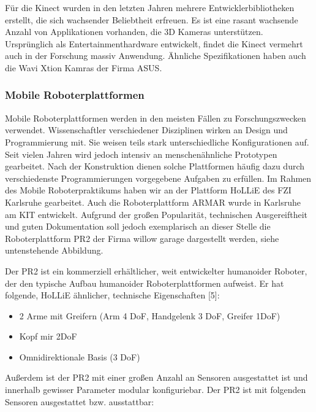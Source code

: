 
Für die Kinect wurden in den letzten Jahren mehrere Entwicklerbibliotheken erstellt, die sich wachsender Beliebtheit erfreuen.  Es ist eine rasant wachsende Anzahl von Applikationen vorhanden, die 3D Kameras unterstützen. Ursprünglich als Entertainmenthardware entwickelt, findet die Kinect vermehrt auch in der Forschung massiv Anwendung. Ähnliche Spezifikationen haben auch die Wavi Xtion Kamras der Firma ASUS.

\subsubsection{Mobile Roboterplattformen}

Mobile Roboterplattformen werden in den meisten Fällen zu Forschungszwecken verwendet. Wissenschaftler verschiedener Disziplinen wirken an Design und Programmierung mit. Sie weisen teils stark unterschiedliche Konfigurationen auf. Seit vielen Jahren wird jedoch intensiv an menschenähnliche Prototypen gearbeitet. Nach der Konstruktion dienen solche Plattformen häufig dazu durch verschiedenste Programmierungen vorgegebene Aufgaben zu erfüllen. Im Rahmen des Mobile Roboterpraktikums haben wir an der Plattform HoLLiE des FZI Karlsruhe gearbeitet. Auch die Roboterplattform ARMAR wurde in Karlsruhe am KIT entwickelt.
Aufgrund der großen Popularität, technischen Ausgereiftheit und guten Dokumentation soll jedoch exemplarisch an dieser Stelle die Roboterplattform PR2 der Firma willow garage dargestellt werden, siehe untenstehende Abbildung.


Der PR2 ist ein kommerziell erhältlicher, weit entwickelter humanoider Roboter, der den typische Aufbau humanoider Roboterplattformen aufweist. Er hat folgende, HoLLiE ähnlicher, technische Eigenschaften [5]:

\begin{itemize}
  \item 2 Arme mit Greifern (Arm 4 DoF, Handgelenk 3 DoF, Greifer 1DoF)
  \item Kopf mir 2DoF
  \item Omnidirektionale Basis (3 DoF)
\end{itemize}

Außerdem ist der PR2 mit einer großen Anzahl an Sensoren ausgestattet ist und innerhalb gewisser Parameter modular konfiguriebar. Der PR2 ist mit folgenden Sensoren ausgestattet bzw. ausstattbar:

